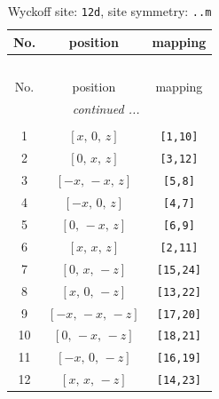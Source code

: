 \documentclass[fleqn,8pt]{jsarticle}
\begin{document}
\renewcommand{\arraystretch}{1.2}
\begin{longtable}{ccc}
\caption{Wyckoff site: {\tt 12d}, site symmetry: {\tt ..m}}
 \\
 \hline \hline
No. & position & mapping \\ \hline \endfirsthead

\multicolumn{2}{l}{\tablename\ \thetable{}} \\
 \hline \hline
No. & position & mapping \\ \hline \endhead

 \hline \hline
\multicolumn{2}{r}{\footnotesize\it continued ...} \\ \endfoot

 \hline \hline
\multicolumn{2}{r}{} \\ \endlastfoot

1 & $\left[ x,\, 0,\, z \right]$ & {\tt [1,10]} \\ \hline
2 & $\left[ 0,\, x,\, z \right]$ & {\tt [3,12]} \\ \hline
3 & $\left[ - x,\, - x,\, z \right]$ & {\tt [5,8]} \\ \hline
4 & $\left[ - x,\, 0,\, z \right]$ & {\tt [4,7]} \\ \hline
5 & $\left[ 0,\, - x,\, z \right]$ & {\tt [6,9]} \\ \hline
6 & $\left[ x,\, x,\, z \right]$ & {\tt [2,11]} \\ \hline
7 & $\left[ 0,\, x,\, - z \right]$ & {\tt [15,24]} \\ \hline
8 & $\left[ x,\, 0,\, - z \right]$ & {\tt [13,22]} \\ \hline
9 & $\left[ - x,\, - x,\, - z \right]$ & {\tt [17,20]} \\ \hline
10 & $\left[ 0,\, - x,\, - z \right]$ & {\tt [18,21]} \\ \hline
11 & $\left[ - x,\, 0,\, - z \right]$ & {\tt [16,19]} \\ \hline
12 & $\left[ x,\, x,\, - z \right]$ & {\tt [14,23]} \\
\end{longtable}
\renewcommand{\arraystretch}{1.2}
\end{document}

